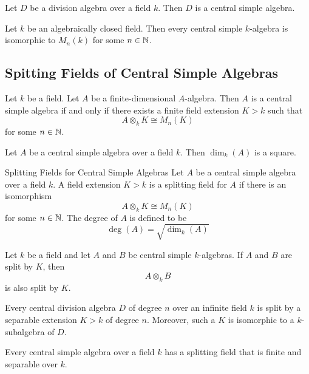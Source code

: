 \documentclass[a4paper]{article}
\begin{document}
\begin{lmm}{}{} Let $D$ be a division algebra over a field $k$. Then $D$ is a central simple algebra. 
\end{lmm}

\begin{thm}{}{} Let $k$ be an algebraically closed field. Then every central simple $k$-algebra is isomorphic to $M_n(k)$ for some $n\in\mathbb{N}$. 
\end{thm}

\subsection{Spitting Fields of Central Simple Algebras}
\begin{thm}{}{} Let $k$ be a field. Let $A$ be a finite-dimensional $A$-algebra. Then $A$ is a central simple algebra if and only if there exists a finite field extension $K>k$ such that $$A\otimes_k K\cong M_n(K)$$ for some $n\in\mathbb{N}$. 
\end{thm}

\begin{crl}{}{} Let $A$ be a central simple algebra over a field $k$. Then $\dim_k(A)$ is a square. 
\end{crl}

\begin{defn}{Splitting Fields for Central Simple Algebras}{} Let $A$ be a central simple algebra over a field $k$. A field extension $K>k$ is a splitting field for $A$ if there is an isomorphism $$A\otimes_kK\cong M_n(K)$$ for some $n\in\mathbb{N}$. The degree of $A$ is defined to be $$\deg(A)=\sqrt{\dim_k(A)}$$
\end{defn}

\begin{lmm}{}{} Let $k$ be a field and let $A$ and $B$ be central simple $k$-algebras. If $A$ and $B$ are split by $K$, then $$A\otimes_k B$$ is also split by $K$. 
\end{lmm}

\begin{thm}{}{} Every central division algebra $D$ of degree $n$ over an infinite field $k$ is split by a separable extension $K>k$ of degree $n$. Moreover, such a $K$ is isomorphic to a $k$-subalgebra of $D$. 
\end{thm}

\begin{crl}{}{} Every central simple algebra over a field $k$ has a splitting field that is finite and separable over $k$. 
\end{crl}
\end{document}
